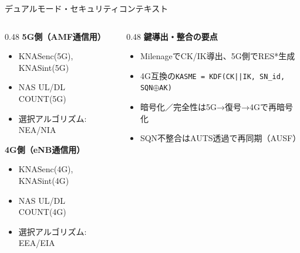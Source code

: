 \documentclass[dvipdfmx,11pt,aspectratio=169]{beamer}
\begin{document}
\begin{frame}{デュアルモード・セキュリティコンテキスト}
  \begin{columns}[T]
    \begin{column}{0.48\textwidth}
      \textbf{5G側（AMF通信用）}
      \begin{itemize}
        \item KNASenc(5G), KNASint(5G)
        \item NAS UL/DL COUNT(5G)
        \item 選択アルゴリズム: NEA/NIA
      \end{itemize}
      \vspace{0.3cm}
      \textbf{4G側（eNB通信用）}
      \begin{itemize}
        \item KNASenc(4G), KNASint(4G)
        \item NAS UL/DL COUNT(4G)
        \item 選択アルゴリズム: EEA/EIA
      \end{itemize}
    \end{column}
    \begin{column}{0.48\textwidth}
      \textbf{鍵導出・整合の要点}
      \begin{itemize}
        \item MilenageでCK/IK導出、5G側でRES*生成
        \item 4G互換の\texttt{KASME = KDF(CK||IK, SN\_id, SQN\(\oplus\)AK)}
        \item 暗号化／完全性は5G→復号→4Gで再暗号化
        \item SQN不整合はAUTS透過で再同期（AUSF）
      \end{itemize}
    \end{column}
  \end{columns}
\end{frame}
\end{document}
